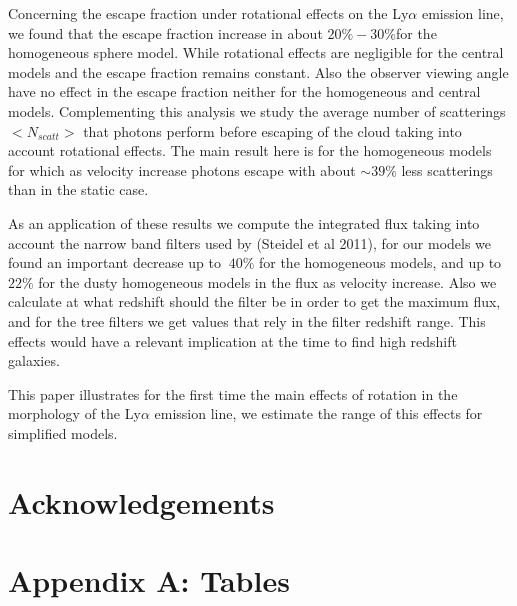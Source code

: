 \documentclass[usenatbib]{mn2e}
\begin{document}
Concerning the escape fraction under rotational effects on the
Ly$\alpha$ emission line, we found that the escape fraction increase
in about $20\%-30\%$for the homogeneous sphere model. While rotational
effects are negligible for the central models and the escape fraction
remains constant. Also the observer viewing angle have no effect in
the escape fraction neither for the homogeneous and central
models. Complementing this analysis we study the average number of
scatterings $<N_{scatt}>$ that photons perform before escaping of the
cloud taking into account rotational effects. The main result here is
for the homogeneous models for which as velocity increase photons
escape with about $\sim 39\%$  less scatterings than in the static
case. 

As an application of these results we compute the integrated flux
taking into account the narrow band filters used by (Steidel et al
2011), for our models we found an important decrease up to $~40\%$ for
the homogeneous models, and up to $22\%$ for the dusty homogeneous
models in the flux as velocity increase.  Also we calculate at what
redshift should the filter be in order to get the maximum  flux, and
for the tree filters we get values that rely in the filter redshift
range. This effects would have a relevant implication at the time to
find high redshift galaxies.

This paper illustrates for the first time the main effects of rotation
in the morphology of the Ly$\alpha$ emission line, we estimate the
range of this effects for simplified models.


\section*{Acknowledgements}


 

\section*{Appendix A: Tables}
\end{document}
